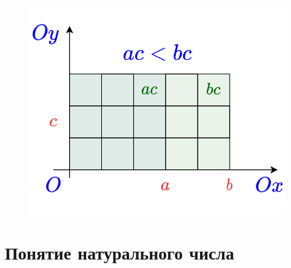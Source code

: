 \begin{enumerate}[label=P\arabic*]
\begin{figure}[hbt!]
\begin{center}
\includegraphics[scale=0.2]{monot.png}
\end{center}
\caption{}\label{monot}
\end{figure}

\end{enumerate}




\section{Понятие натурального числа}



